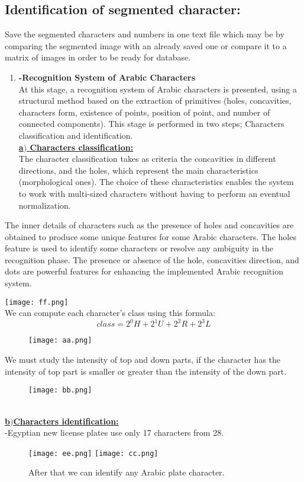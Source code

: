 \subsection{ Identification of segmented character:}
Save the segmented characters and numbers in one text file which
may be by comparing the segmented image with an already saved
one or compare it to a matrix of images in order to be ready for
database.
\begin{enumerate}
	\item \textbf{-Recognition System of Arabic Characters}\\
	At this stage, a recognition system of Arabic characters
	is presented, using a structural method based on the
	extraction of primitives (holes, concavities, characters
	form, existence of points, position of point, and number
	of connected components). This stage is performed in
	two steps;
	Characters classification and identification.\\
	\uline{\textbf{a$)$ Characters classification:}}\\
	The character classification takes as criteria the
	concavities in different directions, and the holes, which
	represent the main characteristics (morphological ones).
	The choice of these characteristics enables the system
	to work with multi-sized characters without having to
	perform an eventual normalization.
\end{enumerate}
\noindent The inner details of characters such as the presence of holes and
concavities are obtained to produce some unique features for some
Arabic characters. The holes feature is used to identify some
characters or resolve any ambiguity in the recognition phase. The
presence or absence of the hole, concavities direction, and dots are
powerful features for enhancing the implemented Arabic
recognition system. 

\texttt{[image: ff.png]}\\
We can compute each character's class using this formula:
\begin{equation*}
	class=2^0H+2^1U+2^2R+2^3L
\end{equation*}

\begin{figure}[h]
	\centering
    \texttt{[image: aa.png]}
\end{figure}

We must study the intensity of top and down parts, if the character
has the intensity of top part is smaller or greater than the intensity
of the down part. 
\begin{figure}[h]
	\centering
	\texttt{[image: bb.png]}
\end{figure}
\\
\uline{\textbf{b$)$Characters identification:}}\\
-Egyptian new license plates use only 17 characters
from 28.
\begin{figure}[h]
	\centering
	\texttt{[image: ee.png]}
	\texttt{[image: cc.png]}
	\caption*{After that we can identify any Arabic plate character.}
\end{figure}
